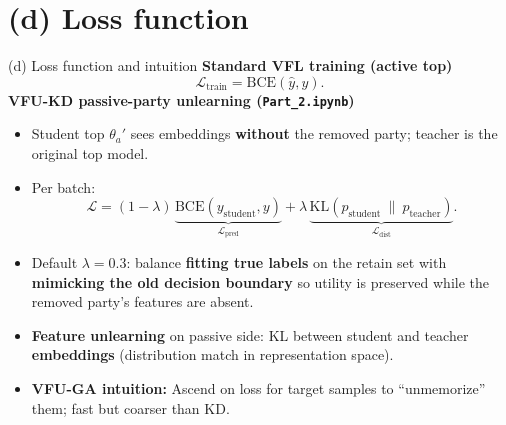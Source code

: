 \documentclass[11pt,aspectratio=169]{beamer}
\begin{document}
\section*{(d) Loss function}
\begin{frame}{(d) Loss function and intuition}
  \textbf{Standard VFL training (active top)}
  \[
    \mathcal{L}_{\text{train}} = \mathrm{BCE}(\hat{y}, y).
  \]
  \textbf{VFU-KD passive-party unlearning (\texttt{Part\_2.ipynb})}
  \begin{itemize}
    \item Student top $\theta_a'$ sees embeddings \textbf{without} the removed party; teacher is the original top model.
    \item Per batch:
    \[
      \mathcal{L} = (1-\lambda)\,\underbrace{\mathrm{BCE}(y_{\text{student}}, y)}_{\mathcal{L}_{\text{pred}}}
      + \lambda\,\underbrace{\mathrm{KL}(p_{\text{student}}\ \|\ p_{\text{teacher}})}_{\mathcal{L}_{\text{dist}}}.
    \]
    \item Default $\lambda = 0.3$: balance \textbf{fitting true labels} on the retain set with \textbf{mimicking the old decision boundary} so utility is preserved while the removed party's features are absent.
    \item \textbf{Feature unlearning} on passive side: KL between student and teacher \textbf{embeddings} (distribution match in representation space).
    \item \textbf{VFU-GA intuition:} Ascend on loss for target samples to ``unmemorize'' them; fast but coarser than KD.
  \end{itemize}
\end{frame}

\end{document}
